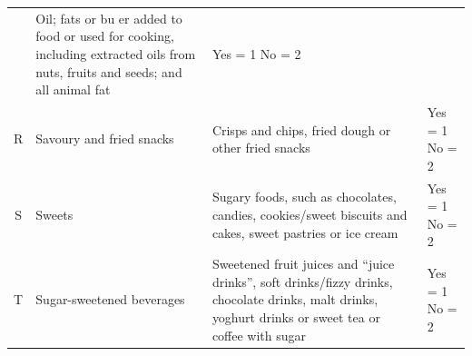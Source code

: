 \documentclass[12pt,]{book}
\theoremstyle{definition}
\theoremstyle{definition}
\theoremstyle{definition}
\theoremstyle{remark}
\begin{document}
\begin{longtable}[]{@{}clll@{}}
\begin{minipage}[t]{0.18\columnwidth}
\end{minipage} & \begin{minipage}[t]{0.54\columnwidth}\raggedright
Oil; fats or bu er added to food or used for cooking, including
extracted oils from nuts, fruits and seeds; and all animal fat\strut
\end{minipage} & \begin{minipage}[t]{0.12\columnwidth}\raggedright
Yes = 1 No = 2\strut
\end{minipage}\tabularnewline
\begin{minipage}[t]{0.05\columnwidth}\centering
R\strut
\end{minipage} & \begin{minipage}[t]{0.18\columnwidth}\raggedright
Savoury and fried snacks\strut
\end{minipage} & \begin{minipage}[t]{0.54\columnwidth}\raggedright
Crisps and chips, fried dough or other fried snacks\strut
\end{minipage} & \begin{minipage}[t]{0.12\columnwidth}\raggedright
Yes = 1 No = 2\strut
\end{minipage}\tabularnewline
\begin{minipage}[t]{0.05\columnwidth}\centering
S\strut
\end{minipage} & \begin{minipage}[t]{0.18\columnwidth}\raggedright
Sweets\strut
\end{minipage} & \begin{minipage}[t]{0.54\columnwidth}\raggedright
Sugary foods, such as chocolates, candies, cookies/sweet biscuits and
cakes, sweet pastries or ice cream\strut
\end{minipage} & \begin{minipage}[t]{0.12\columnwidth}\raggedright
Yes = 1 No = 2\strut
\end{minipage}\tabularnewline
\begin{minipage}[t]{0.05\columnwidth}\centering
T\strut
\end{minipage} & \begin{minipage}[t]{0.18\columnwidth}\raggedright
Sugar-sweetened beverages\strut
\end{minipage} & \begin{minipage}[t]{0.54\columnwidth}\raggedright
Sweetened fruit juices and ``juice drinks'', soft drinks/fizzy drinks,
chocolate drinks, malt drinks, yoghurt drinks or sweet tea or coffee
with sugar\strut
\end{minipage} & \begin{minipage}[t]{0.12\columnwidth}\raggedright
Yes = 1 No = 2\strut
\end{minipage}\tabularnewline
\bottomrule
\end{longtable}
\end{document}

